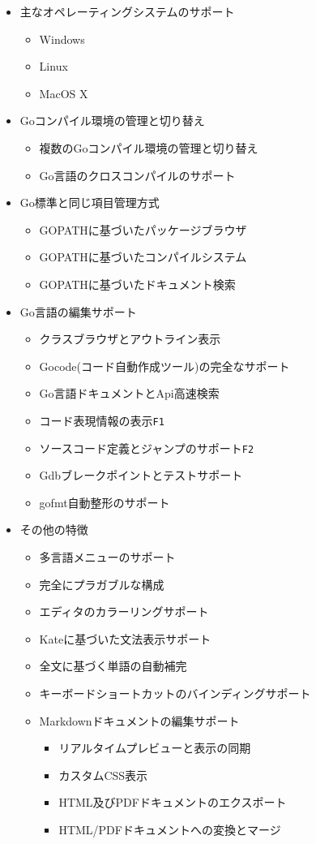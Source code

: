\begin{itemize}
  \item 主なオペレーティングシステムのサポート
  \begin{itemize}
    \item Windows
    \item Linux
    \item MacOS X
  \end{itemize}

  \item Goコンパイル環境の管理と切り替え
    \begin{itemize}
    \item 複数のGoコンパイル環境の管理と切り替え
    \item Go言語のクロスコンパイルのサポート
    \end{itemize}

  \item Go標準と同じ項目管理方式
    \begin{itemize}
    \item GOPATHに基づいたパッケージブラウザ
    \item GOPATHに基づいたコンパイルシステム
    \item GOPATHに基づいたドキュメント検索
    \end{itemize}
  \item Go言語の編集サポート
    \begin{itemize}
    \item クラスブラウザとアウトライン表示
    \item Gocode(コード自動作成ツール)の完全なサポート
    \item Go言語ドキュメントとApi高速検索
    \item コード表現情報の表示\texttt{F1}
    \item ソースコード定義とジャンプのサポート\texttt{F2}
    \item Gdbブレークポイントとテストサポート
    \item gofmt自動整形のサポート
    \end{itemize}
  \item その他の特徴
    \begin{itemize}
    \item 多言語メニューのサポート
    \item 完全にプラガブルな構成
    \item エディタのカラーリングサポート
    \item Kateに基づいた文法表示サポート
    \item 全文に基づく単語の自動補完
    \item キーボードショートカットのバインディングサポート
    \item Markdownドキュメントの編集サポート
      \begin{itemize}
      \item リアルタイムプレビューと表示の同期
      \item カスタムCSS表示
      \item HTML及びPDFドキュメントのエクスポート
      \item HTML\//PDFドキュメントへの変換とマージ
      \end{itemize}
    \end{itemize}
\end{itemize}
